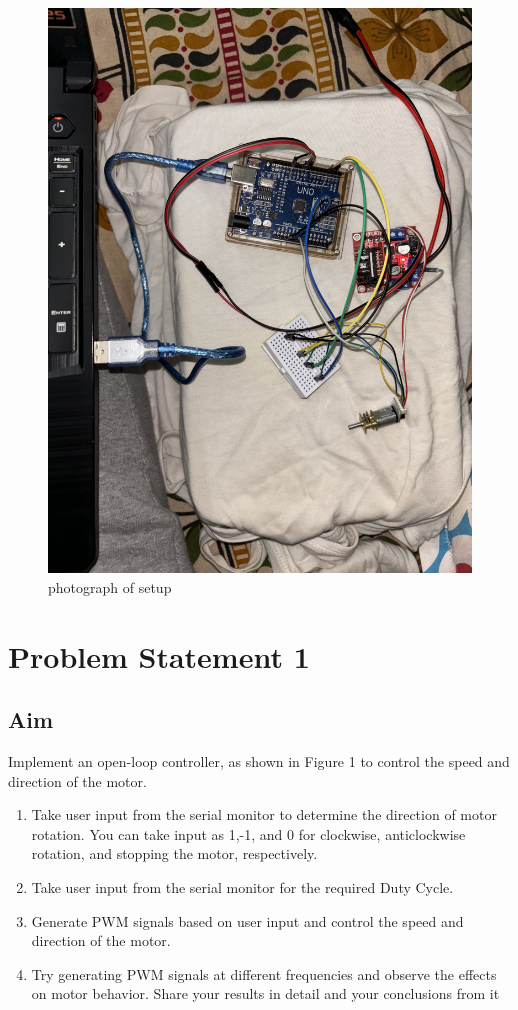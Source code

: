 \documentclass[12pt]{article}
\begin{document}
\begin{figure}[ht!]
    \centering
    \includegraphics[width=\textwidth]{images/setup.jpeg}
    \caption{photograph of setup}
\end{figure}

\pagebreak
\section{Problem Statement 1}

\subsection{Aim}

Implement an open-loop controller, as shown in Figure 1 to control the speed and direction of the motor.
\begin{enumerate}
    \item Take user input from the serial monitor to determine the direction of motor rotation. You can take input as 1,-1, and 0 for clockwise, anticlockwise rotation, and stopping the motor, respectively.
    \item Take user input from the serial monitor for the required Duty Cycle.
    \item Generate PWM signals based on user input and control the speed and direction of the motor.
    \item Try generating PWM signals at different frequencies and observe the effects on motor behavior. Share your results in detail and your conclusions from it
\end{enumerate}
\end{document}

